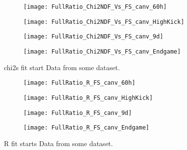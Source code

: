 \begin{figure}[]
\centering
    \begin{subfigure}[]{0.45\textwidth}
        \centering
        \texttt{[image: FullRatio\_Chi2NDF\_Vs\_FS\_canv\_60h]}
        \caption{}
    \end{subfigure}%
    \begin{subfigure}[]{0.45\textwidth}
        \centering
        \texttt{[image: FullRatio\_Chi2NDF\_Vs\_FS\_canv\_HighKick]}
        \caption{}
    \end{subfigure}

    \begin{subfigure}[]{0.45\textwidth}
        \centering
        \texttt{[image: FullRatio\_Chi2NDF\_Vs\_FS\_canv\_9d]}
        \caption{}
    \end{subfigure}%
    \begin{subfigure}[]{0.45\textwidth}
        \centering
        \texttt{[image: FullRatio\_Chi2NDF\_Vs\_FS\_canv\_Endgame]}
        \caption{}
    \end{subfigure}
\caption[]{chi2s fit start Data from some dataset.}
\label{fig:}
\end{figure}

\begin{figure}[]
\centering
    \begin{subfigure}[]{0.45\textwidth}
        \centering
        \texttt{[image: FullRatio\_R\_FS\_canv\_60h]}
        \caption{}
    \end{subfigure}%
    \begin{subfigure}[]{0.45\textwidth}
        \centering
        \texttt{[image: FullRatio\_R\_FS\_canv\_HighKick]}
        \caption{}
    \end{subfigure}

    \begin{subfigure}[]{0.45\textwidth}
        \centering
        \texttt{[image: FullRatio\_R\_FS\_canv\_9d]}
        \caption{}
    \end{subfigure}%
    \begin{subfigure}[]{0.45\textwidth}
        \centering
        \texttt{[image: FullRatio\_R\_FS\_canv\_Endgame]}
        \caption{}
    \end{subfigure}
\caption[]{R fit starts Data from some dataset.}
\label{fig:}
\end{figure}


